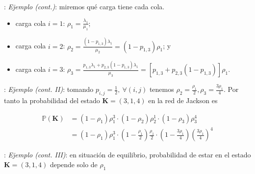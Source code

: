 \documentclass[xcolor={x11names}]{beamer}
\begin{document}
\begin{frame}{\secname: \subsecname}
    \textit{Ejemplo (cont.)}: miremos qué
    carga tiene cada cola.

    \begin{itemize}
        \item carga cola $i=1$:
            $\rho_1=\tfrac{\lambda_1}{\mu_1}$;
        \item carga cola $i=2$:
            $\rho_2=\tfrac{(1-p_{1,3})\lambda_1}{\mu_2}=(1-p_{1,3})\rho_1$; y
        \item carga cola $i=3$:
            $\rho_3=\tfrac{p_{1,3}\lambda_1
            +p_{2,3}(1-p_{1,3})\lambda_1}{\mu_3}=[p_{1,3}+p_{2,3}(1-p_{1,3})]\rho_1$.
    \end{itemize}


    \begin{figure}
        \resizebox{.7\textwidth}{!}{%
            
        }
    \end{figure}
\end{frame}



\begin{frame}{\secname: \subsecname}
    \textit{Ejemplo (cont. II)}: tomando
    $p_{i,j}=\tfrac{1}{2},\ \forall (i,j)$ 
    tenemos $\rho_2=\tfrac{\rho_1}{2},
    \rho_3=\tfrac{3\rho_1}{4}$.
    Por tanto la probabilidad del estado
    $\mathbf{K}=(3,1,4)$ en la red de Jackson
    es

    \begin{align*}
        \mathbb{P}(\mathbf{K})&=
        (1-\rho_1)\rho_1^3\cdot
        (1-\rho_2)\rho_2^1 \cdot
        (1-\rho_3)\rho_3^4\\
        &= (1-\rho_1)\rho_1^3\cdot
        \left(1-\frac{\rho_1}{2}\right)\frac{\rho_1}{2}\cdot
        \left(1-\frac{3\rho_1}{4}\right)\left(
        \frac{3\rho_1}{4}\right)^4
    \end{align*}



    \begin{figure}
        \resizebox{.7\textwidth}{!}{%
            
        }
    \end{figure}
\end{frame}




\begin{frame}{\secname: \subsecname}
    \textit{Ejemplo (cont. III)}: en situación
    de equilibrio,
    probabilidad de estar en el estado
    $\mathbf{K}=(3,1,4)$ depende solo de
    $\rho_1$
    \begin{figure}
        
    \end{figure}
\end{frame}
\end{document}
